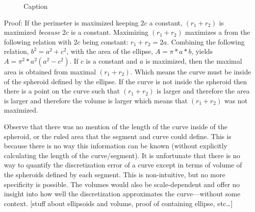 \begin{figure}[h!]
  \caption{\label{EllipseGeometry} Caption}
\end{figure}

Proof: If the perimeter is maximized keeping $2c$ a constant, $(r_1 + r_2)$ is maximized \textit{because} $2c$ is a constant.  Maximizing $(r_1+r_2)$ maximizes a from the following relation with $2c$ being constant: $r_1 + r_2 = 2a$.  Combining the following relation, $b^2 = a^2 + c^2$, with the area of the ellipse, $A = \pi * a * b$, yields $A=\pi^{2}*a^{2}(a^{2} - c^2)$.  If $c$ is a constant and $a$ is maximized, then the maximal area is obtained from maximal $(r_1+r_2)$.  Which means the curve must be inside of the spheroid defined by the ellipse.  If the curve is not inside the spheroid then there is a point on the curve such that $(r_1+r_2)$ is larger and therefore the area is larger and therefore the volume is larger which means that $(r_1+r_2)$ was not maximized.

        Observe that there was no mention of the length of the curve inside of the spheroid, or the ruled area that the segment and curve could define.  This is because there is no way this information can be known (without explicitly calculating the length of the curve/segment).  It is unfortunate that there is no way to quantify the discretization error of a curve except in terms of volume of the spheroids defined by each segment.  This is non-intuitive, but no more specificity is possible.  The volumes would also be scale-dependent and offer no insight into how well the discretization approximates the curve—without some context.
[stuff about ellipsoids and volume, proof of containing ellipse, etc…]

